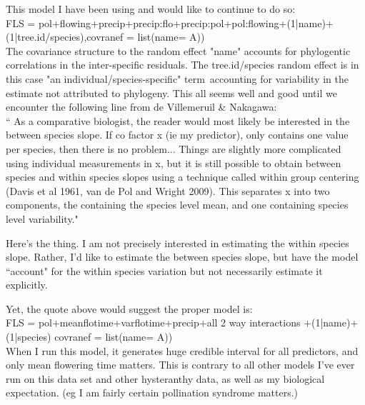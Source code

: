 \documentclass{article}\usepackage[]{graphicx}\usepackage[]{color}
\begin{document}
This model I have been using and would like to continue to do so:\\
FLS = pol+flowing+precip+precip:flo+precip:pol+pol:flowing+(1|name)+(1|tree.id/species),covranef = list(name= A))\\  

The covariance structure to the random effect "name" accounts for phylogentic correlations in the inter-specific residuals. The tree.id/species random effect is in this case "an individual/species-specific" term accounting for variability in the estimate not attributed to phylogeny. This all seems well and good until we encounter the following line from de Villemeruil & Nakagawa:\\

`` As a comparative biologist, the reader would most likely be interested in the between species slope. If co factor x (ie my predictor), only contains one value per species, then there is no problem... Things are slightly more complicated  using individual measurements in x, but it is still possible to obtain between species and within species slopes using a technique called within group centering  (Davis et al 1961, van de Pol and Wright 2009). This separates x into two components, the containing the species level mean, and one containing species level variability."

Here's the thing. I am not precisely interested in estimating the within species slope. Rather, I'd like to estimate the between species slope, but have the model ``account" for the within species variation but not necessarily estimate it explicitly.

Yet, the quote above would suggest the proper model is:\\

FLS = pol+meanflotime+varflotime+precip+all 2 way interactions +(1|name)+(1|species) covranef = list(name= A))\\

When I run this model, it generates huge credible interval for all predictors, and only mean flowering time matters. This is contrary to all other models I've ever run on this data set and other hysteranthy data, as well as my biological expectation. (eg I am fairly certain pollination syndrome matters.)\\
\end{document}
